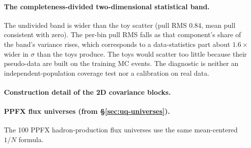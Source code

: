 \paragraph{The completeness-divided two-dimensional statistical band.} The undivided band is wider than the toy scatter (pull RMS 0.84, mean pull consistent with zero). The per-bin pull RMS falls as that component's share of the band's variance rises, which corresponds to a data-statistics part about $1.6\times$ wider in $\sigma$ than the toys produce. The toys would scatter too little because their pseudo-data are built on the training MC events. The diagnostic is neither an independent-population coverage test nor a calibration on real data.

\paragraph{Construction detail of the 2D covariance blocks.}

\paragraph{PPFX flux universes (from \S\ref{sec:uq-universes}).} The 100 PPFX hadron-production flux universes use the same mean-centered $1/N$ formula.


